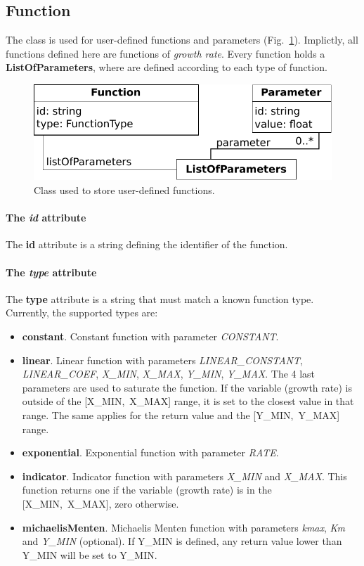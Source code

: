 \subsection{Function}
\label{sec:function}

The \function{} class is used for user-defined functions and parameters
(Fig.~\ref{fig:parameters_function}).
Implictly, all functions defined here are functions of \emph{growth rate}.
Every function holds a \textbf{ListOfParameters},
where \parameter{} are defined according to each type of function.

\begin{figure}
  \centering
  \includegraphics[scale=0.9]{figures/parameters_function}
  \caption{Class used to store user-defined functions.}
\label{fig:parameters_function}
\end{figure}

\paragraph{The \textit{id} attribute}
The \textbf{id} attribute is a string defining the identifier of the function.

\paragraph{The \textit{type} attribute}
The \textbf{type} attribute is a string that must match a known function type.
Currently, the supported types are:
\begin{itemize}
  \item \textbf{constant}.
  Constant function with parameter
  \textit{CONSTANT}.
  \item \textbf{linear}.
  Linear function with parameters
  \textit{LINEAR\_CONSTANT}, \textit{LINEAR\_COEF},
  \textit{X\_MIN}, \textit{X\_MAX}, \textit{Y\_MIN}, \textit{Y\_MAX}.
  The 4 last parameters are used to saturate the function.
  If the variable (growth rate) is outside of the [X\_MIN,~X\_MAX] range,
  it is set to the closest value in that range.
  The same applies for the return value and the [Y\_MIN,~Y\_MAX] range.
  \item \textbf{exponential}.
  Exponential function with parameter \textit{RATE}.
  \item \textbf{indicator}.
  Indicator function with parameters
  \textit{X\_MIN} and \textit{X\_MAX}.
  This function returns one if the variable (growth rate) is in the
  [X\_MIN,~X\_MAX], zero otherwise.
  \item \textbf{michaelisMenten}.
  Michaelis Menten function with parameters
  \textit{kmax}, \textit{Km} and \textit{Y\_MIN} (optional).
  If Y\_MIN is defined, any return value lower than Y\_MIN will be set to
  Y\_MIN.\@
\end{itemize}


